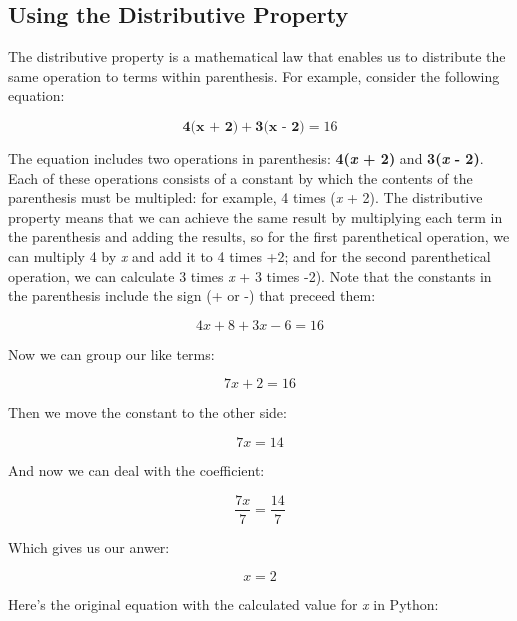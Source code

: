\documentclass[11pt]{article}
\begin{document}
    \subsection{Using the Distributive
Property}\label{using-the-distributive-property}

The distributive property is a mathematical law that enables us to
distribute the same operation to terms within parenthesis. For example,
consider the following equation:

\begin{equation}\textbf{4(x + 2)} + \textbf{3(x - 2)} = 16 \end{equation}

The equation includes two operations in parenthesis: \textbf{4(\emph{x}
+ 2)} and \textbf{3(\emph{x} - 2)}. Each of these operations consists of
a constant by which the contents of the parenthesis must be multipled:
for example, 4 times (\emph{x} + 2). The distributive property means
that we can achieve the same result by multiplying each term in the
parenthesis and adding the results, so for the first parenthetical
operation, we can multiply 4 by \emph{x} and add it to 4 times +2; and
for the second parenthetical operation, we can calculate 3 times
\emph{x} + 3 times -2). Note that the constants in the parenthesis
include the sign (+ or -) that preceed them:

\begin{equation}4x + 8 + 3x - 6 = 16 \end{equation}

Now we can group our like terms:

\begin{equation}7x + 2 = 16 \end{equation}

Then we move the constant to the other side:

\begin{equation}7x = 14 \end{equation}

And now we can deal with the coefficient:

\begin{equation}\frac{7x}{7} = \frac{14}{7} \end{equation}

Which gives us our anwer:

\begin{equation}x = 2 \end{equation}

Here's the original equation with the calculated value for \emph{x} in
Python:
\end{document}
